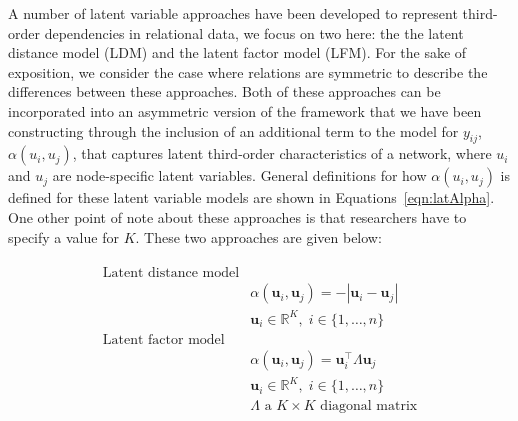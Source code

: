 \documentclass[12pt,pdflatex]{elsarticle}
\begin{document}
A number of latent variable approaches have been developed to represent third-order dependencies in relational data, we focus on two here: the the latent distance model (LDM) and the latent factor model (LFM). For the sake of exposition, we consider the case where relations are symmetric to describe the differences between these approaches. Both of these approaches can be incorporated into an asymmetric version of the framework that we have been constructing through the inclusion of an additional term to the model for $y_{ij}$, $\alpha(u_{i}, u_{j})$, that captures latent third-order characteristics of a network, where $u_{i}$ and $u_{j}$ are node-specific latent variables. General definitions for how $\alpha(u_{i}, u_{j})$ is defined for these latent variable models are shown in Equations~\ref{eqn:latAlpha}. One other point of note about these approaches is that researchers have to specify a value for $K$.
These two approaches are given below:

\begin{align}
\begin{aligned}
\text{Latent distance model} \\
	&\alpha(\textbf{u}_{i}, \textbf{u}_{j}) = -|\textbf{u}_{i} - \textbf{u}_{j}| \\
	&\textbf{u}_{i} \in \mathbb{R}^{K}, \; i \in \{1, \ldots, n \} \\
\text{Latent factor model} \\
	&\alpha(\textbf{u}_{i}, \textbf{u}_{j}) = \textbf{u}_{i}^{\top} \Lambda \textbf{u}_{j} \\
	&\textbf{u}_{i} \in \mathbb{R}^{K}, \; i \in \{1, \ldots, n \} \\
	&\Lambda \text{ a } K \times K \text{ diagonal matrix}
\label{eqn:latAlpha}
\end{aligned}
\end{align}
\end{document}
